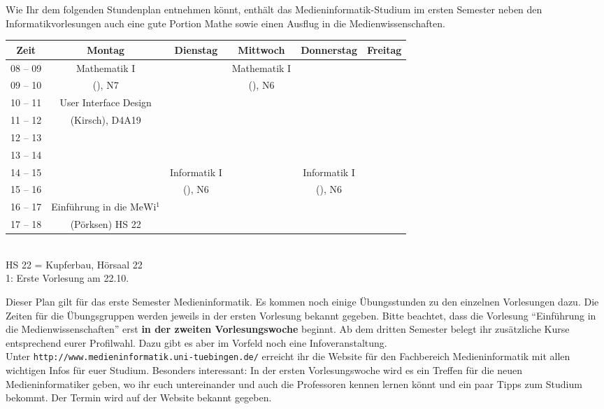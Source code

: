
Wie Ihr dem folgenden Stundenplan entnehmen könnt, enthält das Medieninformatik-Studium im ersten
Semester neben den Informatikvorlesungen auch eine gute Portion Mathe sowie einen Ausflug in die Medienwissenschaften. 

\begin{center}
	\begin{tabular}{|c|c|c|c|c|c|} \hline
		Zeit      & 			Montag 		& Dienstag			& Mittwoch 			& Donnerstag 			& Freitag	 \\
		\hline\hline
		08 -- 09  & 		Mathematik I 	&  					& Mathematik I 		&  						&			\\
		\cline{1-1}\cline{3-3}\cline{5-6}
		09 -- 10  & 		(\Matheprof), N7& 					& (\Matheprof), N6  &  						&			\\
		\hline
		10 -- 11  &	User Interface Design	&					&					&						&			\\
		\cline{1-1}\cline{3-6}
		11 -- 12 & 	(Kirsch), D4A19			&  					&					&			 			& 			\\
		\hline
		12 -- 13 & 							&  					& 				    & 						& 			 \\
		\hline
		13 -- 14 & 							& 					&   				 & 						& 			 \\
		\hline
		14 -- 15 & 							& Informatik I 		& 					& Informatik I 			& 				\\
		\cline{1-2}\cline{4-4}\cline{6-6}
		15 -- 16 &							& (\Infoprof), N6 	& 					& (\Infoprof), N6 		& 				\\
		\hline
		16 -- 17 & Einführung in die MeWi$^1$ &  	 & 		&						&\\
		\cline{1-1}\cline{3-6}
		17 -- 18 & 	(Pörksen) HS 22 	 	&  &					& 						& \\
		\hline
	\end{tabular}\\
\scriptsize HS 22 = Kupferbau, Hörsaal 22 \\
1: Erste Vorlesung am 22.10.

\end{center}

Dieser Plan gilt für das erste Semester Medieninformatik. 
Es kommen noch einige Übungsstunden
zu den einzelnen Vorlesungen dazu. Die Zeiten für die Übungsgruppen werden jeweils in der ersten Vorlesung bekannt gegeben.
Bitte beachtet, dass die Vorlesung "`Einführung in die Medienwissenschaften"' erst \textbf{in der zweiten Vorlesungswoche} beginnt.
Ab dem dritten Semester belegt ihr zusätzliche Kurse entsprechend eurer Profilwahl. Dazu gibt es aber im Vorfeld noch eine Infoveranstaltung.\\
Unter \texttt{http://www.medieninformatik.uni-tuebingen.de/} erreicht ihr die Website für den Fachbereich Medieninformatik mit allen wichtigen Infos für euer Studium. Besonders interessant: In der ersten Vorlesungswoche wird es ein Treffen für die neuen Medieninformatiker geben, wo ihr euch untereinander und auch die Professoren kennen lernen könnt und ein paar Tipps zum Studium bekommt. Der Termin wird auf der Website bekannt gegeben. %
